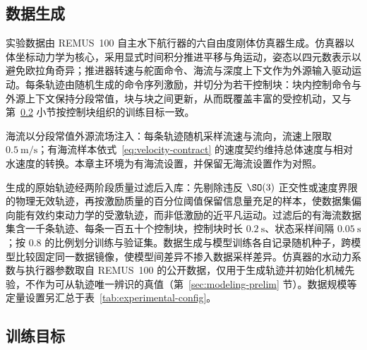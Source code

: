 \subsection{数据生成}
\label{subsec:data-generation}

实验数据由 REMUS~100 自主水下航行器的六自由度刚体仿真器生成。仿真器以体坐标动力学为核心，采用显式时间积分推进平移与角运动，姿态以四元数表示以避免欧拉角奇异；推进器转速与舵面命令、海流与深度上下文作为外源输入驱动运动。每条轨迹由随机生成的命令序列激励，并切分为若干控制块：块内控制命令与外源上下文保持分段常值，块与块之间更新，从而既覆盖丰富的受控机动，又与第~\ref{subsec:training-objective} 小节按控制块组织的训练目标一致。

海流以分段常值外源流场注入：每条轨迹随机采样流速与流向，流速上限取 \(0.5~\mathrm{m/s}\)；有海流样本依式~\eqref{eq:velocity-contract} 的速度契约维持总体速度与相对水速度的转换。本章主环境为有海流设置，并保留无海流设置作为对照。

生成的原始轨迹经两阶段质量过滤后入库：先剔除违反 \(\SO(3)\) 正交性或速度界限的物理无效轨迹，再按激励质量的百分位阈值保留信息量充足的样本，使数据集偏向能有效约束动力学的受激轨迹，而非低激励的近平凡运动。过滤后的有海流数据集含一千条轨迹、每条一百五十个控制块，控制块时长 \(0.2~\mathrm{s}\)、状态采样间隔 \(0.05~\mathrm{s}\)；按 \(0.8\) 的比例划分训练与验证集。数据生成与模型训练各自记录随机种子，跨模型比较固定同一数据镜像，使模型间差异不掺入数据采样差异。仿真器的水动力系数与执行器参数取自 REMUS~100 的公开数据，仅用于生成轨迹并初始化机械先验，不作为可从轨迹唯一辨识的真值（第~\ref{sec:modeling-prelim} 节）。数据规模等定量设置另汇总于表~\ref{tab:experimental-config}。

\subsection{训练目标}
\label{subsec:training-objective}

